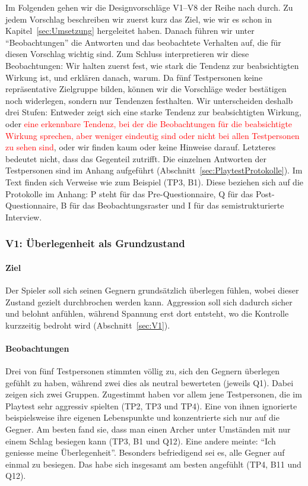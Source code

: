 \documentclass[../Main.tex]{subfiles}
\begin{document}
Im Folgenden gehen wir die Designvorschläge V1--V8 der Reihe nach durch. Zu jedem Vorschlag beschreiben wir zuerst kurz das Ziel, wie wir es schon in Kapitel~\ref{sec:Umsetzung} hergeleitet haben. Danach führen wir unter \enquote{Beobachtungen} die Antworten und das beobachtete Verhalten auf, die für diesen Vorschlag wichtig sind. Zum Schluss interpretieren wir diese Beobachtungen: Wir halten zuerst fest, wie stark die Tendenz zur beabsichtigten Wirkung ist, und erklären danach, warum. Da fünf Testpersonen keine repräsentative Zielgruppe bilden, können wir die Vorschläge weder bestätigen noch widerlegen, sondern nur Tendenzen festhalten. Wir unterscheiden deshalb drei Stufen: Entweder zeigt sich eine starke Tendenz zur beabsichtigten Wirkung, oder \textcolor{red}{eine erkennbare Tendenz, bei der die Beobachtungen für die beabsichtigte Wirkung sprechen, aber weniger eindeutig sind oder nicht bei allen Testpersonen zu sehen sind}, oder wir finden kaum oder keine Hinweise darauf. Letzteres bedeutet nicht, dass das Gegenteil zutrifft. Die einzelnen Antworten der Testpersonen sind im Anhang aufgeführt (Abschnitt~\ref{sec:PlaytestProtokolle}). Im Text finden sich Verweise wie zum Beispiel (TP3, B1). Diese beziehen sich auf die Protokolle im Anhang: P steht für das Pre-Questionnaire, Q für das Post-Questionnaire, B für das Beobachtungsraster und I für das semistrukturierte Interview.

\subsubsection{V1: Überlegenheit als Grundzustand}

\paragraph{Ziel}
Der Spieler soll sich seinen Gegnern grundsätzlich überlegen fühlen, wobei dieser Zustand gezielt durchbrochen werden kann. Aggression soll sich dadurch sicher und belohnt anfühlen, während Spannung erst dort entsteht, wo die Kontrolle kurzzeitig bedroht wird (Abschnitt~\ref{sec:V1}).

\paragraph{Beobachtungen}
Drei von fünf Testpersonen stimmten völlig zu, sich den Gegnern überlegen gefühlt zu haben, während zwei dies als neutral bewerteten (jeweils Q1). Dabei zeigen sich zwei Gruppen. Zugestimmt haben vor allem jene Testpersonen, die im Playtest sehr aggressiv spielten (TP2, TP3 und TP4). Eine von ihnen ignorierte beispielsweise ihre eigenen Lebenspunkte und konzentrierte sich nur auf die Gegner. Am besten fand sie, dass man einen Archer unter Umständen mit nur einem Schlag besiegen kann (TP3, B1 und Q12). Eine andere meinte: \enquote{Ich geniesse meine Überlegenheit}. Besonders befriedigend sei es, alle Gegner auf einmal zu besiegen. Das habe sich insgesamt am besten angefühlt (TP4, B11 und Q12).
\end{document}
